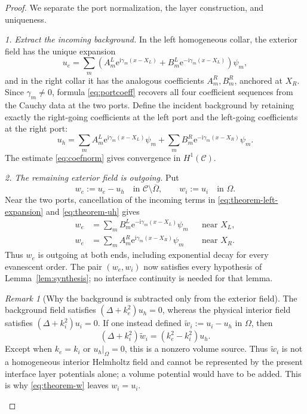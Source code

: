 \documentclass[11pt]{article}
\newcommand{\C}{\mathcal C}
\newcommand{\Om}{\Omega}
\newcommand{\ii}{\mathrm i}
\newcommand{\ee}{\mathrm e}
\theoremstyle{plain}
\theoremstyle{definition}
\theoremstyle{remark}
\newtheorem{remark}[theorem]{Remark}
\begin{document}
\begin{proof}
We separate the port normalization, the layer construction, and uniqueness.

\emph{1. Extract the incoming background.}
In the left homogeneous collar, the exterior field has the unique expansion
\begin{equation}
u_e=\sum_m\left(
A_m^L\ee^{\ii\gamma_m(x-X_L)}
+B_m^L\ee^{-\ii\gamma_m(x-X_L)}
\right)\psi_m,
\label{eq:theorem-left-expansion}
\end{equation}
and in the right collar it has the analogous coefficients
\(A_m^R,B_m^R\), anchored at \(X_R\).  Since \(\gamma_m\ne0\), formula
\eqref{eq:portcoeff} recovers all four coefficient sequences from the Cauchy
data at the two ports.  Define the incident background by retaining exactly
the right-going coefficients at the left port and the left-going coefficients
at the right port:
\begin{equation}
u_h=\sum_m A_m^L\ee^{\ii\gamma_m(x-X_L)}\psi_m
+\sum_m B_m^R\ee^{-\ii\gamma_m(x-X_R)}\psi_m.
\label{eq:theorem-uh}
\end{equation}
The estimate \eqref{eq:coefnorm} gives convergence in \(H^1(\C)\).

\emph{2. The remaining exterior field is outgoing.}
Put
\begin{equation}
w_e:=u_e-u_h\quad\text{in }\C\setminus\overline\Om,
\qquad
w_i:=u_i\quad\text{in }\Om.
\label{eq:theorem-w}
\end{equation}
Near the two ports, cancellation of the incoming terms in
\eqref{eq:theorem-left-expansion} and \eqref{eq:theorem-uh} gives
\begin{align}
w_e&=\sum_m B_m^L\ee^{-\ii\gamma_m(x-X_L)}\psi_m
&&\text{near }X_L,\label{eq:w-left-out}\\
w_e&=\sum_m A_m^R\ee^{\ii\gamma_m(x-X_R)}\psi_m
&&\text{near }X_R.\label{eq:w-right-out}
\end{align}
Thus \(w_e\) is outgoing at both ends, including exponential decay for every
evanescent order.  The pair \((w_e,w_i)\) now satisfies every hypothesis of
Lemma~\ref{lem:synthesis}; no interface continuity is needed for that lemma.

\begin{remark}[Why the background is subtracted only from the exterior field]
The background field satisfies
\((\Delta+k_e^2)u_h=0\), whereas the physical interior field satisfies
\((\Delta+k_i^2)u_i=0\).  If one instead defined
\(\widetilde w_i:=u_i-u_h\) in \(\Om\), then
\begin{equation}
  (\Delta+k_i^2)\widetilde w_i
  =(k_e^2-k_i^2)u_h.
  \label{eq:interior-background-subtraction}
\end{equation}
Except when $k_e=k_i$ or $u_h|_\Om=0$, this is a nonzero volume source.
Thus \(\widetilde w_i\) is not a homogeneous interior Helmholtz field and
cannot be represented by the present interface layer potentials alone; a
volume potential would have to be added.  This is why
\eqref{eq:theorem-w} leaves $w_i=u_i$.
\end{remark}


\end{proof}
\end{document}
